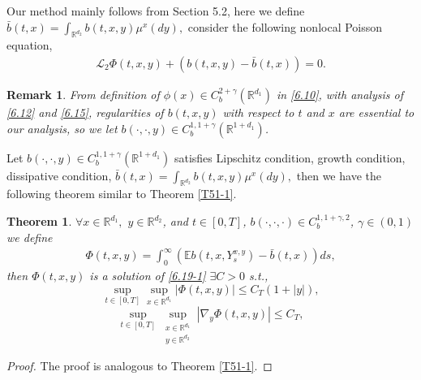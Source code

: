 \documentclass[11pt,reqno]{amsart}
\newtheorem{theorem}{\indent Theorem}[section]
\newtheorem{remark}{\indent Remark}[section]
\numberwithin{equation}{section}
\begin{document}
Our method mainly follows from Section 5.2,  here we define  $\bar{b}(t,x)=\int_{\mathbb{R}^{ d_{2}}}b(t,x,y)\mu^{x}(dy),$ consider the following nonlocal Poisson equation, 
\begin{equation}\label{6.19-1}
	\begin{split}
		\mathcal{L}_{2}\Phi(t,x,y)+( b(t,x,y)-\bar{b}(t,x))=0.
	\end{split}
\end{equation}
\begin{remark}
	From definition of $\phi(x)\in C^{2+\gamma}_{b}(\mathbb{R}^{d_{1}})$ in \eqref{6.10}, with analysis of \eqref{6.12} and \eqref{6.15}, regularities of $b(t,x,y)$ with respect to $t$ and $x$ are essential to our analysis, so we let $b(\cdot,\cdot,y)\in C_{b}^{1,1+\gamma}(\mathbb{R}^{1+d_{1}})$.
\end{remark}
Let $b(\cdot,\cdot,y)\in C_{b}^{1,1+\gamma}(\mathbb{R}^{1+d_{1}})$ satisfies Lipschitz condition, growth condition, dissipative condition, $ \bar{b}(t,x)=\int_{\mathbb{R}^{d_{2}}}b(t,x,y)\mu^{x}(dy),$
then we have the following theorem similar to Theorem  \ref{T51-1}.
\begin{theorem}\label{T61-1}
	$\forall x\in \mathbb{R}^{d_{1}}, $  $y\in \mathbb{R}^{d_{2}} $, and $t\in [0,T]$, %
	 $b(\cdot,\cdot,\cdot)\in C_{b}^{1, 1+\gamma,2}$, $\gamma\in (0,1)$ we define 
	\begin{equation}\label{6.2-1}
		\begin{split}
		\Phi(t,x,y)=\int^{\infty}_{0}\left( \mathbb{E}b(t,x,Y_{s}^{x,y})-\bar{b}(t,x)\right) ds,
		\end{split}
	\end{equation}
	then $\Phi(t,x,y)$ is a solution of \eqref{6.19-1} %
	$\exists C>0$ s.t.,
	\begin{equation}\label{6.3-1}
		\sup_{t\in [0,T]}\sup_{x\in \mathbb{R}^{d_{1}}}|\Phi(t,x,y)|\leq C_{T}(1+|y|),
	\end{equation}
	\begin{equation}\label{6.4-1}
		\sup_{t\in [0,T]}\sup_{\substack{x\in \mathbb{R}^{d_{1}}\\ y\in \mathbb{R}^{d_{2}}}}|\nabla_{y}\Phi(t,x,y)|\leq C_{T},
	\end{equation}
\end{theorem}
\begin{proof}
The proof is analogous to Theorem \ref{T51-1}.
\end{proof}
\end{document}
